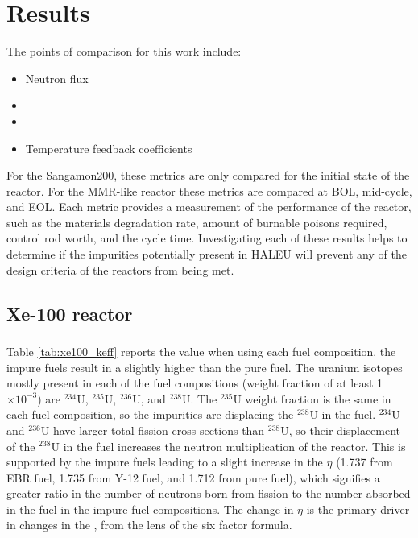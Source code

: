 \section{Results}
The points of comparison for this work include:
\begin{itemize}
        \item Neutron flux 
        \item \keff 
        \item \betaEff
        \item Temperature feedback coefficients
\end{itemize}

For the Sangamon200, these metrics are only compared for the initial 
state of the reactor. For the \gls{MMR}-like reactor these metrics 
are compared at \gls{BOL}, mid-cycle, and \gls{EOL}. Each metric provides a 
measurement of the performance of 
the reactor, such as the materials degradation rate, amount of burnable 
poisons required, control rod worth, and the cycle time. Investigating 
each of these results helps to determine if the impurities potentially 
present in \gls{HALEU} will prevent any of the design criteria of the 
reactors from being met. 

\subsection{Xe-100 reactor}

\subsubsection{\keff}
Table \ref{tab:xe100_keff} reports the \keff value when using each fuel 
composition. the impure fuels result in a slightly higher \keff 
than the pure fuel. The uranium isotopes mostly present in 
each of the fuel compositions (weight fraction of at least 1$\times 10^{-3}$)
are $^{234}$U, $^{235}$U, $^{236}$U, and $^{238}$U. The $^{235}$U weight 
fraction is the same in each fuel composition, so the impurities are 
displacing the $^{238}$U in the fuel. $^{234}$U and $^{236}$U have larger 
total fission cross sections than $^{238}$U, so their displacement of the
$^{238}$U in the fuel increases the neutron multiplication of the reactor. 
This is supported by the impure fuels leading to a slight increase 
in the $\eta$ (1.737 from \gls{EBR} fuel, 1.735 from Y-12 fuel, and 1.712 
from pure fuel), which signifies a greater ratio in the number of neutrons
born from fission to the number absorbed in the fuel in the impure 
fuel compositions. The change in $\eta$ is the primary driver in changes 
in the \keff, from the lens of the six factor formula. 

